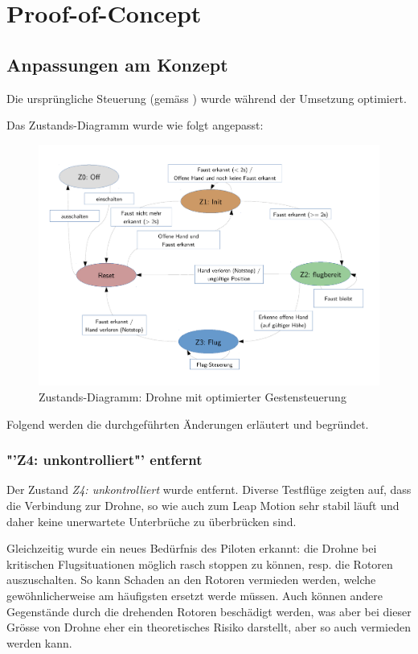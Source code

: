 \chapter{Proof-of-Concept}

\section{Anpassungen am Konzept}
\label{sec:poc:conceptChanges}
Die ursprüngliche Steuerung (gemäss ) wurde während der Umsetzung optimiert.

Das Zustands-Diagramm wurde wie folgt angepasst:
\begin{figure}[H]
	\centering
	\includegraphics[width=1.0\textwidth]{figures/concept/state-diagram-2.pdf}
	\caption[Zustands-Diagramm: Drohne mit optimierter Gestensteuerung optimiert]{Zustands-Diagramm: Drohne mit optimierter Gestensteuerung}
\end{figure}

Folgend werden die durchgeführten Änderungen erläutert und begründet.

\subsection{"'Z4: unkontrolliert"' entfernt}
Der Zustand \textit{Z4: unkontrolliert} wurde entfernt.
Diverse Testflüge zeigten auf, dass die Verbindung zur Drohne, so wie auch zum Leap Motion sehr stabil läuft und daher keine unerwartete Unterbrüche zu überbrücken sind.

Gleichzeitig wurde ein neues Bedürfnis des Piloten erkannt: die Drohne bei kritischen Flugsituationen möglich rasch stoppen zu können, resp. die Rotoren auszuschalten.
So kann Schaden an den Rotoren vermieden werden, welche gewöhnlicherweise am häufigsten ersetzt werde müssen.
Auch können andere Gegenstände durch die drehenden Rotoren beschädigt werden, was aber bei dieser Grösse von Drohne eher ein theoretisches Risiko darstellt, aber so auch vermieden werden kann.

